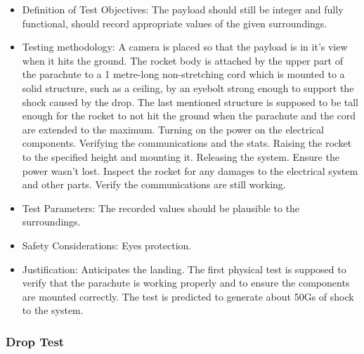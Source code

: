 \begin{itemize}
 \item Definition of Test Objectives: The payload should still be integer and fully functional, should record appropriate values of the given surroundings.
 \item Testing methodology: A camera is placed so that the payload is in it’s view when it hits the ground. The rocket body is attached by the upper part of the parachute to a 1 metre-long non-stretching cord which is mounted to a solid structure, such as a ceiling, by an eyebolt strong enough to support the shock caused by the drop. The last mentioned structure is supposed to be tall enough for the rocket to not hit the ground when the parachute and the cord are extended to the maximum. Turning on the power on the electrical components. Verifying the communications and the stats. Raising the rocket to the specified height and mounting it. Releasing the system. Ensure the power wasn’t lost. Inspect the rocket for any damages to the electrical system and other parts. Verify the communications are still working.
 \item Test Parameters: The recorded values should be plausible to the surroundings.
 \item Safety Considerations: Eyes protection.
 \item Justification: Anticipates the landing. The first physical test is supposed to verify that the parachute is working properly and to ensure the components are mounted correctly. The test is predicted to generate about 50Gs of shock to the system.
\end{itemize}

\subsubsection{Drop Test}

